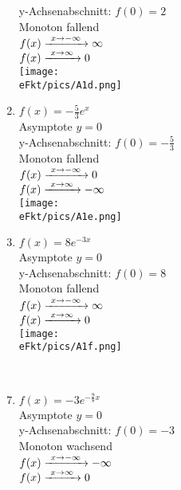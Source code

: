 \begin{Answer}[ref=eFktA1]
\begin{minipage}{\textwidth}
\begin{minipage}[t]{0.49\textwidth}
\begin{enumerate}[label=\alph*)]
				y-Achsenabschnitt: \(f(0)=2\)\\
				Monoton fallend\\
				\(f(x)\xrightarrow{\hphantom{\ }x\to-\infty\hphantom{\ }}\infty\)\\
				\(f(x)\xrightarrow{\hphantom{\ }x\to\infty\hphantom{\ }}0\)\\
				\texttt{[image: \\eFkt/pics/A1d.png]}
				\item \(f(x)=-\frac{5}{3}e^{x}\)\\
				Asymptote \(y=0\)\\
				y-Achsenabschnitt: \(f(0)=-\frac{5}{3}\)\\
				Monoton fallend\\
				\(f(x)\xrightarrow{\hphantom{\ }x\to-\infty\hphantom{\ }}0\)\\
				\(f(x)\xrightarrow{\hphantom{\ }x\to\infty\hphantom{\ }}-\infty\)\\
				\texttt{[image: \\eFkt/pics/A1e.png]}
				\item \(f(x)=8e^{-3x}\)\\
				Asymptote \(y=0\)\\
				y-Achsenabschnitt: \(f(0)=8\)\\
				Monoton fallend\\
				\(f(x)\xrightarrow{\hphantom{\ }x\to-\infty\hphantom{\ }}\infty\)\\
				\(f(x)\xrightarrow{\hphantom{\ }x\to\infty\hphantom{\ }}0\)\\
				\texttt{[image: \\eFkt/pics/A1f.png]}
			\end{enumerate}
		\end{minipage}
	\end{minipage}\\
	\begin{minipage}{\textwidth}
		\begin{minipage}[t]{0.49\textwidth}
			\begin{enumerate}[label=\alph*)]
				\setcounter{enumi}{6}
				\item \(f(x)=-3e^{-\frac{9}{8}x}\)\\
				Asymptote \(y=0\)\\
				y-Achsenabschnitt: \(f(0)=-3\)\\
				Monoton wachsend\\
				\(f(x)\xrightarrow{\hphantom{\ }x\to-\infty\hphantom{\ }}-\infty\)\\
				\(f(x)\xrightarrow{\hphantom{\ }x\to\infty\hphantom{\ }}0\)\\

\end{enumerate}
\end{minipage}
\end{minipage}
\end{Answer}
